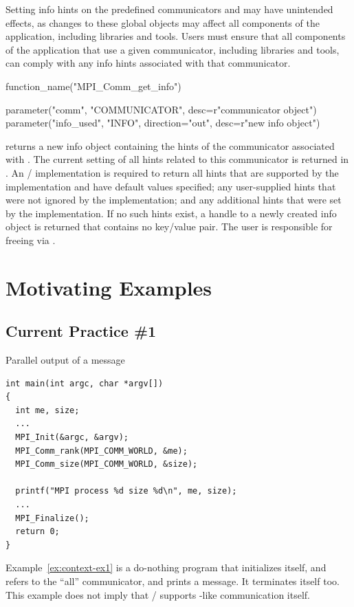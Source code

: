\begin{users}
Setting info hints on the predefined communicators 
and  may have unintended effects, as changes to these
global objects may affect all components of the application, including
libraries and tools.
Users must ensure that all components of the application that use a given
communicator, including libraries and tools, can comply with any info hints
associated with that communicator.
\end{users}

%
\begin{mpi-binding}
    function_name("MPI_Comm_get_info")
    
    parameter("comm", "COMMUNICATOR", desc=r"communicator object")
    parameter("info_used", "INFO", direction="out", desc=r"new info object")
\end{mpi-binding}

 returns a new info object containing
the hints of the communicator associated with .
The current setting of all hints related to this communicator is
returned in . An \MPI/ implementation is required to
return all hints that are supported by the implementation and have
default values specified; any user-supplied hints that were not ignored
by the implementation; and any additional hints that were set by
the implementation.
If no such hints
exist, a handle to a newly created info object is returned that
contains no key/value pair. The user is responsible for freeing
 via .


\section{Motivating Examples}
\label{sec:context:examples}

\subsection{Current Practice \#1}

\begin{example}
\label{ex:context-ex1}
\noindent Parallel output of a message
\begin{lstlisting}[language={[MPI]C}]
int main(int argc, char *argv[])
{
  int me, size;
  ...
  MPI_Init(&argc, &argv);
  MPI_Comm_rank(MPI_COMM_WORLD, &me);
  MPI_Comm_size(MPI_COMM_WORLD, &size);

  printf("MPI process %d size %d\n", me, size);
  ...
  MPI_Finalize();
  return 0;
}
\end{lstlisting}
Example~\ref{ex:context-ex1} is a do-nothing program that initializes itself,
and refers to the ``all'' communicator, and prints a message. It
terminates itself too. This example does not imply that \MPI/
supports -like communication itself.
\end{example}

